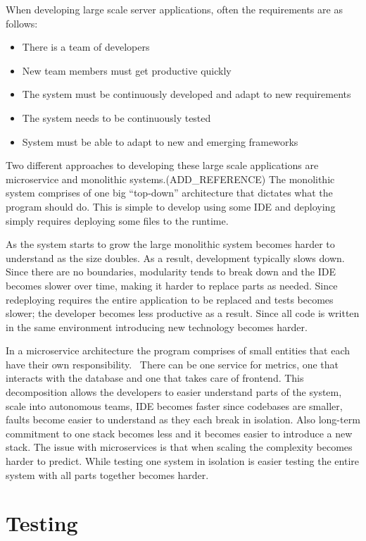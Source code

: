 When developing large scale server applications, often the requirements are as
follows:

\begin{itemize}
    \item There is a team of developers
    \item New team members must get productive quickly
    \item The system must be continuously developed and adapt to new
        requirements
    \item The system needs to be continuously tested
    \item System must be able to adapt to new and emerging frameworks
\end{itemize}

Two different approaches to developing these large scale applications are
microservice and monolithic systems.(ADD\_REFERENCE) The monolithic system
comprises of one big ``top-down'' architecture that dictates what the program
should do. This is simple to develop using some IDE and deploying simply
requires deploying some files to the runtime. 

As the system starts to grow the large monolithic system becomes harder to
understand as the size doubles. As a result, development typically slows down.
Since there are no boundaries, modularity tends to break down and the IDE
becomes slower over time, making it harder to replace parts as needed. Since
redeploying requires the entire application to be replaced and tests becomes
slower; the developer becomes less productive as a result. Since all code is
written in the same environment introducing new technology becomes harder.

In a microservice architecture the program comprises of small entities that each
have their own responsibility.~\cite{chenlianping} There can be one service for
metrics, one that interacts with the database and one that takes care of
frontend. This decomposition allows the developers to easier understand parts of
the system, scale into autonomous teams, IDE becomes faster since codebases are
smaller, faults become easier to understand as they each break in isolation.
Also long-term commitment to one stack becomes less and it becomes easier to
introduce a new stack.  The issue with microservices is that when scaling the
complexity becomes harder to predict. While testing one system in isolation is
easier testing the entire system with all parts together becomes harder.

\section{Testing}

